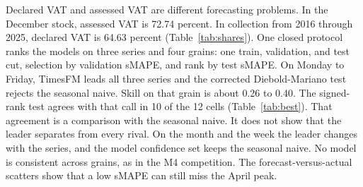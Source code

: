 Declared VAT and assessed VAT are different forecasting problems.
In the December stock, assessed VAT is 72.74 percent.
In collection from 2016 through 2025, declared VAT is 64.63 percent (Table~\ref{tab:shares}).
One closed protocol ranks the models on three series and four grains: one train, validation, and test cut, selection by validation sMAPE, and rank by test sMAPE.
On Monday to Friday, TimesFM leads all three series and the corrected Diebold-Mariano test rejects the seasonal naive.
Skill on that grain is about 0.26 to 0.40.
The signed-rank test agrees with that call in 10 of the 12 cells (Table~\ref{tab:best}).
That agreement is a comparison with the seasonal naive.
It does not show that the leader separates from every rival.
On the month and the week the leader changes with the series, and the model confidence set keeps the seasonal naive.
No model is consistent across grains, as in the M4 competition.
The forecast-versus-actual scatters show that a low sMAPE can still miss the April peak.

